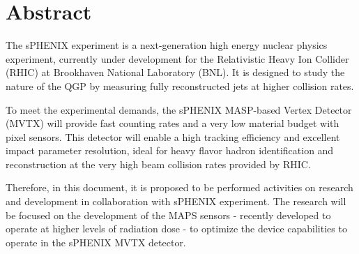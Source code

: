 \chapter*{Abstract}

The sPHENIX experiment is a next-generation high energy nuclear physics experiment, currently under development for the Relativistic Heavy Ion Collider (RHIC) at Brookhaven National Laboratory (BNL). It is designed to study the nature of the QGP by measuring fully reconstructed jets  at higher collision rates. 

To meet the experimental demands, the sPHENIX  MASP-based Vertex Detector (MVTX) will provide fast counting rates and a very low material budget with pixel sensors. This detector will enable a high tracking efficiency and excellent impact parameter resolution, ideal for heavy flavor hadron identification and reconstruction at the very high beam collision rates provided by RHIC.

Therefore, in this document, it is proposed to be performed activities on research and development in collaboration with sPHENIX experiment. The research will be focused on the development of the MAPS sensors - recently developed to operate at higher levels of radiation dose - to optimize the device capabilities to operate in the sPHENIX MVTX detector.


